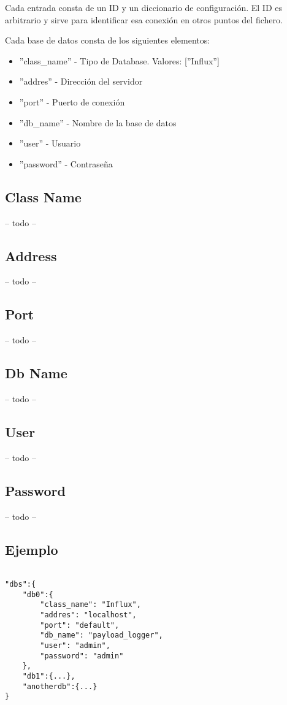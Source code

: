 \documentclass[12pt, a4paper, oneside, titlepage]{article}
\begin{document}
Cada entrada consta de un ID y un diccionario de configuración. El ID es arbitrario y sirve para identificar esa conexión en otros puntos del fichero. 

Cada base de datos consta de los siguientes elementos:
\begin{itemize}
\item	''class\_name'' - Tipo de Database. Valores: [''Influx'']
\item	''addres'' - Dirección del servidor 
\item	''port'' -  Puerto de conexión 
\item	''db\_name'' - Nombre de la base de datos
\item	''user'' - Usuario
\item	''password'' - Contraseña
\end{itemize}
		
\subsection{Class Name}
 -- todo --
\subsection{Address}
 -- todo --
\subsection{Port}
 -- todo --
\subsection{Db Name}
 -- todo --
\subsection{User}
 -- todo --
\subsection{Password}
 -- todo --

		
\subsection{Ejemplo}
\begin{lstlisting}

"dbs":{
	"db0":{
		"class_name": "Influx",
		"addres": "localhost",
		"port": "default",
		"db_name": "payload_logger",
		"user": "admin",
		"password": "admin"
	},
	"db1":{...},
	"anotherdb":{...}
}
\end{lstlisting}
\end{document}
